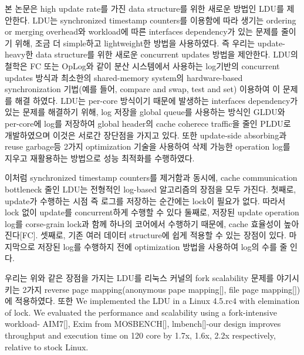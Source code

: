 \fi



%
\ifkor
본 논문은 high update rate를 가진 data structure를 위한 새로운 방법인 LDU를 제안한다. 
LDU는 synchronized timestamp counters를 이용함에 따라 생기는 ordering or merging overhead와
workload에 따른 interfaces dependency가 있는 문제를 줄이기 위해, 조금 더 simple하고
lightweight한 방법을 사용하였다.
즉 우리는 update-heavy한 data structure를 위한 새로운 concurrent updates 방법을 제안한다. 
LDU의 철학은 FC 또는 OpLog와 같이 분산 시스템에서 사용하는 log기반의 concurrent updates 방식과 최소한의
shared-memory system의 hardware-based synchronization 기법(예를 들어, compare and
swap, test and set) 이용하여 이 문제를 해결 하였다.
LDU는 per-core 방식이기 때문에 발생하는 interfaces dependency가 있는 문제를 해결하기 위해, log 저장을
global queue를 사용하는 방식인 GLDU와 per-core에 log를 저장하여 global header의 cache
coherece traffic을 줄인 PLDU로 개발하였으며 이것은 서로간 장단점을 가지고 있다.
또한 update-side absorbing과 reuse garbage등 2가지 optimization 기술을 사용하여 삭제 가능한
operation log를 지우고 재활용하는 방법으로 성능 최적화를 수행하였다.

이처럼 synchronized timestamp counters를 제거함과 동시에, cache communication bottleneck 줄인
LDU는 전형적인 log-based 알고리즘의 장점을 모두 가진다.
첫째로, update가 수행하는 시점 즉 로그를 저장하는 순간에는 lock이 필요가 없다. 
따라서 lock 없이 update를 concurrent하게 수행할 수 있다
둘째로, 저장된 update operation log를 corse-grain lock과 함께 하나의 코어에서 수행하기 때문에,
cache 효율성이 높아진다[FC].
셋째로, 기존 여러 데이터 structure에 쉽게 적용할 수 있는 장점이 있다.
마지막으로 저장된 log를 수행하지 전에 optimization 방법을 사용하여 log의 수를 줄 인다.
\else

\fi


\ifkor
우리는 위와 같은 장점을 가지는 LDU를 리눅스 커널의 fork scalability 문제를 야기시키는 2가지 reverse page
mapping(anonymous pape mapping[], file page mapping[])에 적용하였다.
또한 We implemented the LDU in a Linux 4.5.rc4 with elemination of lock. 
We evaluated the performance and scalability using a fork-intensive workload-
AIM7[], Exim from MOSBENCH[], lmbench[]-our design improves throughput and
execution time on 120 core by 1.7x, 1.6x, 2.2x respectively, relative to stock Linux.
  
